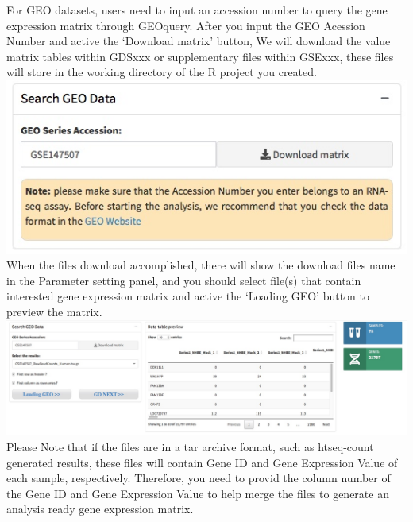 \documentclass[
  a4paper,
  oneside]{book}
\begin{document}
For GEO datasets, users need to input an accession number to query the gene expression matrix through GEOquery. After you input the GEO Acession Number and active the `Download matrix' button, We will download the value matrix tables within GDSxxx or supplementary files within GSExxx, these files will store in the working directory of the R project you created.\\
\includegraphics{images/search_geo_dataset.jpeg}\\

When the files download accomplished, there will show the download files name in the Parameter setting panel, and you should select file(s) that contain interested gene expression matrix and active the `Loading GEO' button to preview the matrix.\\
\includegraphics{images/geo_preview_single.jpeg}\\
Please Note that if the files are in a tar archive format, such as htseq-count generated results, these files will contain Gene ID and Gene Expression Value of each sample, respectively. Therefore, you need to provid the column number of the Gene ID and Gene Expression Value to help merge the files to generate an analysis ready gene expression matrix.
\end{document}

